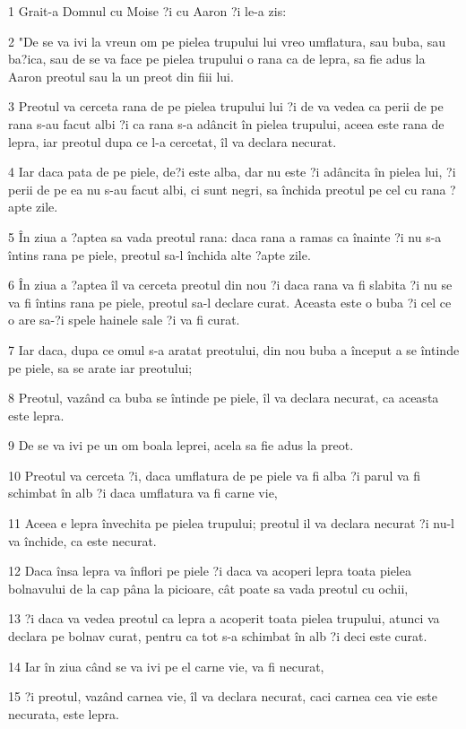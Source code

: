 \par 1 Grait-a Domnul cu Moise ?i cu Aaron ?i le-a zis:
\par 2 "De se va ivi la vreun om pe pielea trupului lui vreo umflatura, sau buba, sau ba?ica, sau de se va face pe pielea trupului o rana ca de lepra, sa fie adus la Aaron preotul sau la un preot din fiii lui.
\par 3 Preotul va cerceta rana de pe pielea trupului lui ?i de va vedea ca perii de pe rana s-au facut albi ?i ca rana s-a adâncit în pielea trupului, aceea este rana de lepra, iar preotul dupa ce l-a cercetat, îl va declara necurat.
\par 4 Iar daca pata de pe piele, de?i este alba, dar nu este ?i adâncita în pielea lui, ?i perii de pe ea nu s-au facut albi, ci sunt negri, sa închida preotul pe cel cu rana ?apte zile.
\par 5 În ziua a ?aptea sa vada preotul rana: daca rana a ramas ca înainte ?i nu s-a întins rana pe piele, preotul sa-l închida alte ?apte zile.
\par 6 În ziua a ?aptea îl va cerceta preotul din nou ?i daca rana va fi slabita ?i nu se va fi întins rana pe piele, preotul sa-l declare curat. Aceasta este o buba ?i cel ce o are sa-?i spele hainele sale ?i va fi curat.
\par 7 Iar daca, dupa ce omul s-a aratat preotului, din nou buba a început a se întinde pe piele, sa se arate iar preotului;
\par 8 Preotul, vazând ca buba se întinde pe piele, îl va declara necurat, ca aceasta este lepra.
\par 9 De se va ivi pe un om boala leprei, acela sa fie adus la preot.
\par 10 Preotul va cerceta ?i, daca umflatura de pe piele va fi alba ?i parul va fi schimbat în alb ?i daca umflatura va fi carne vie,
\par 11 Aceea e lepra învechita pe pielea trupului; preotul il va declara necurat ?i nu-l va închide, ca este necurat.
\par 12 Daca însa lepra va înflori pe piele ?i daca va acoperi lepra toata pielea bolnavului de la cap pâna la picioare, cât poate sa vada preotul cu ochii,
\par 13 ?i daca va vedea preotul ca lepra a acoperit toata pielea trupului, atunci va declara pe bolnav curat, pentru ca tot s-a schimbat în alb ?i deci este curat.
\par 14 Iar în ziua când se va ivi pe el carne vie, va fi necurat,
\par 15 ?i preotul, vazând carnea vie, îl va declara necurat, caci carnea cea vie este necurata, este lepra.
